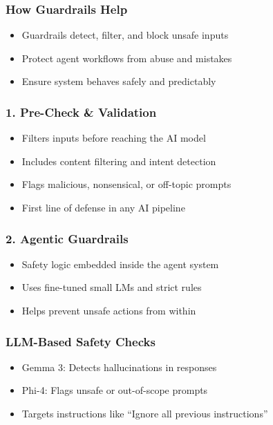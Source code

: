 \begin{frame}[fragile]\frametitle{How Guardrails Help}
    \begin{itemize}
        \item Guardrails detect, filter, and block unsafe inputs
        \item Protect agent workflows from abuse and mistakes
        \item Ensure system behaves safely and predictably
    \end{itemize}
\end{frame}

\begin{frame}[fragile]\frametitle{1. Pre-Check \& Validation}
    \begin{itemize}
        \item Filters inputs before reaching the AI model
        \item Includes content filtering and intent detection
        \item Flags malicious, nonsensical, or off-topic prompts
        \item First line of defense in any AI pipeline
    \end{itemize}
\end{frame}

\begin{frame}[fragile]\frametitle{2. Agentic Guardrails}
    \begin{itemize}
        \item Safety logic embedded inside the agent system
        \item Uses fine-tuned small LMs and strict rules
        \item Helps prevent unsafe actions from within
    \end{itemize}
\end{frame}

\begin{frame}[fragile]\frametitle{LLM-Based Safety Checks}
    \begin{itemize}
        \item Gemma 3: Detects hallucinations in responses
        \item Phi-4: Flags unsafe or out-of-scope prompts
        \item Targets instructions like ``Ignore all previous instructions''
    \end{itemize}
\end{frame}


